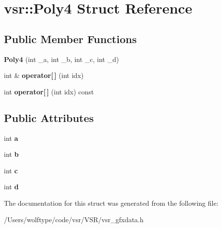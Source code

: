 \hypertarget{structvsr_1_1_poly4}{\section{vsr\-:\-:Poly4 Struct Reference}
\label{structvsr_1_1_poly4}
}
\subsection*{Public Member Functions}
\begin{DoxyCompactItemize}
\item 
\hypertarget{structvsr_1_1_poly4_a3a85514ee11718744cbfc4999a0582f7}{{\bfseries Poly4} (int \-\_\-a, int \-\_\-b, int \-\_\-c, int \-\_\-d)}\label{structvsr_1_1_poly4_a3a85514ee11718744cbfc4999a0582f7}

\item 
\hypertarget{structvsr_1_1_poly4_a73237483113e3c6ce3f97ca772eba9a8}{int \& {\bfseries operator\mbox{[}$\,$\mbox{]}} (int idx)}\label{structvsr_1_1_poly4_a73237483113e3c6ce3f97ca772eba9a8}

\item 
\hypertarget{structvsr_1_1_poly4_a6423f84c41d007e1615bf7ec5204dcd8}{int {\bfseries operator\mbox{[}$\,$\mbox{]}} (int idx) const }\label{structvsr_1_1_poly4_a6423f84c41d007e1615bf7ec5204dcd8}

\end{DoxyCompactItemize}
\subsection*{Public Attributes}
\begin{DoxyCompactItemize}
\item 
\hypertarget{structvsr_1_1_poly4_ad5e048aa520d7c956ea80a8f1e7dfbd4}{int {\bfseries a}}\label{structvsr_1_1_poly4_ad5e048aa520d7c956ea80a8f1e7dfbd4}

\item 
\hypertarget{structvsr_1_1_poly4_a913a2d741a8e86c2b064d18364d42b81}{int {\bfseries b}}\label{structvsr_1_1_poly4_a913a2d741a8e86c2b064d18364d42b81}

\item 
\hypertarget{structvsr_1_1_poly4_a47026352544d89419b8d37e53a4b6d12}{int {\bfseries c}}\label{structvsr_1_1_poly4_a47026352544d89419b8d37e53a4b6d12}

\item 
\hypertarget{structvsr_1_1_poly4_a73d6c13ae92f32d6a187da4c025c0dae}{int {\bfseries d}}\label{structvsr_1_1_poly4_a73d6c13ae92f32d6a187da4c025c0dae}

\end{DoxyCompactItemize}


The documentation for this struct was generated from the following file\-:\begin{DoxyCompactItemize}
\item 
/\-Users/wolftype/code/vsr/\-V\-S\-R/vsr\-\_\-gfxdata.\-h\end{DoxyCompactItemize}
